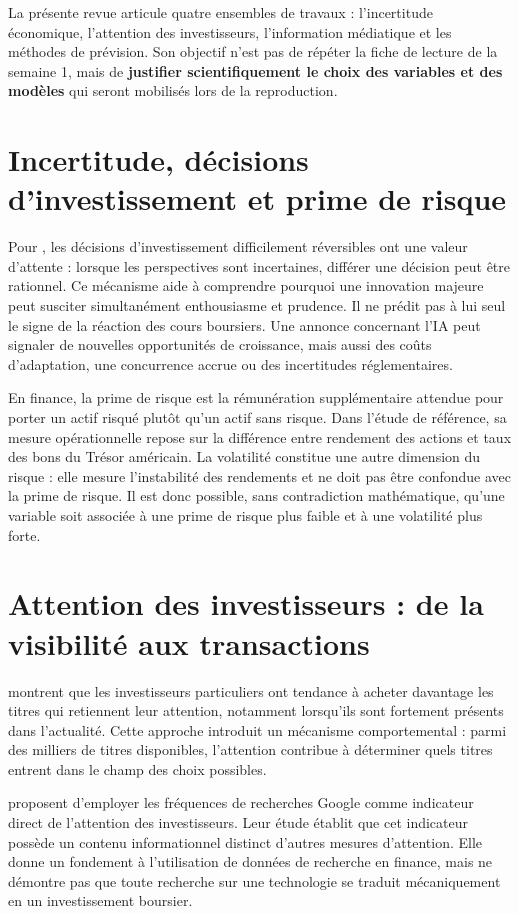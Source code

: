 \documentclass[11pt,a4paper]{article}
\begin{document}
La présente revue articule quatre ensembles de travaux : l'incertitude économique, l'attention des investisseurs, l'information médiatique et les méthodes de prévision. Son objectif n'est pas de répéter la fiche de lecture de la semaine 1, mais de \textbf{justifier scientifiquement le choix des variables et des modèles} qui seront mobilisés lors de la reproduction.

\section{Incertitude, décisions d'investissement et prime de risque}
Pour \cite{Bernanke1983}, les décisions d'investissement difficilement réversibles ont une valeur d'attente : lorsque les perspectives sont incertaines, différer une décision peut être rationnel. Ce mécanisme aide à comprendre pourquoi une innovation majeure peut susciter simultanément enthousiasme et prudence. Il ne prédit pas à lui seul le signe de la réaction des cours boursiers. Une annonce concernant l'IA peut signaler de nouvelles opportunités de croissance, mais aussi des coûts d'adaptation, une concurrence accrue ou des incertitudes réglementaires.

En finance, la prime de risque est la rémunération supplémentaire attendue pour porter un actif risqué plutôt qu'un actif sans risque. Dans l'étude de référence, sa mesure opérationnelle repose sur la différence entre rendement des actions et taux des bons du Trésor américain. La volatilité constitue une autre dimension du risque : elle mesure l'instabilité des rendements et ne doit pas être confondue avec la prime de risque. Il est donc possible, sans contradiction mathématique, qu'une variable soit associée à une prime de risque plus faible et à une volatilité plus forte.

\section{Attention des investisseurs : de la visibilité aux transactions}
\cite{BarberOdean2008} montrent que les investisseurs particuliers ont tendance à acheter davantage les titres qui retiennent leur attention, notamment lorsqu'ils sont fortement présents dans l'actualité. Cette approche introduit un mécanisme comportemental : parmi des milliers de titres disponibles, l'attention contribue à déterminer quels titres entrent dans le champ des choix possibles.

\cite{DaEngelbergGao2011} proposent d'employer les fréquences de recherches Google comme indicateur direct de l'attention des investisseurs. Leur étude établit que cet indicateur possède un contenu informationnel distinct d'autres mesures d'attention. Elle donne un fondement à l'utilisation de données de recherche en finance, mais ne démontre pas que toute recherche sur une technologie se traduit mécaniquement en un investissement boursier.
\end{document}
